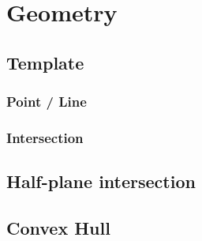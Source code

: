 \documentclass[10pt,twocolumn,oneside]{article} %
\begin{document}

\section{Geometry}

\subsection{Template}

\subsubsection{Point / Line}

\subsubsection{Intersection}

\subsection{Half-plane intersection}

\subsection{Convex Hull}
\end{document}
